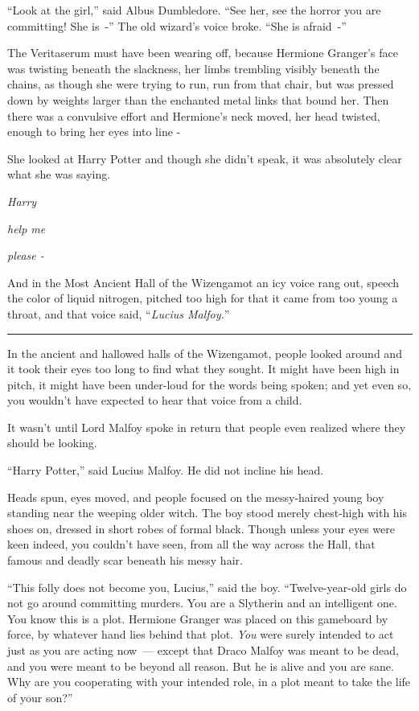 ``Look at the girl,'' said Albus Dumbledore. ``See her, see the horror you are committing! She is~-'' The old wizard's voice broke. ``She is afraid~-''

The Veritaserum must have been wearing off, because Hermione Granger's face was twisting beneath the slackness, her limbs trembling visibly beneath the chains, as though she were trying to run, run from that chair, but was pressed down by weights larger than the enchanted metal links that bound her. Then there was a convulsive effort and Hermione's neck moved, her head twisted, enough to bring her eyes into line -

She looked at Harry Potter and though she didn't speak, it was absolutely clear what she was saying.

\emph{Harry}

\emph{help me}

\emph{please -}

And in the Most Ancient Hall of the Wizengamot an icy voice rang out, speech the color of liquid nitrogen, pitched too high for that it came from too young a throat, and that voice said, ``\emph{Lucius Malfoy.}''

\begin{center}\rule{3in}{0.4pt}\end{center}

In the ancient and hallowed halls of the Wizengamot, people looked around and it took their eyes too long to find what they sought. It might have been high in pitch, it might have been under-loud for the words being spoken; and yet even so, you wouldn't have expected to hear that voice from a child.

It wasn't until Lord Malfoy spoke in return that people even realized where they should be looking.

``Harry Potter,'' said Lucius Malfoy. He did not incline his head.

Heads spun, eyes moved, and people focused on the messy-haired young boy standing near the weeping older witch. The boy stood merely chest-high with his shoes on, dressed in short robes of formal black. Though unless your eyes were keen indeed, you couldn't have seen, from all the way across the Hall, that famous and deadly scar beneath his messy hair.

``This folly does not become you, Lucius,'' said the boy. ``Twelve-year-old girls do not go around committing murders. You are a Slytherin and an intelligent one. You know this is a plot. Hermione Granger was placed on this gameboard by force, by whatever hand lies behind that plot. \emph{You} were surely intended to act just as you are acting now~--- except that Draco Malfoy was meant to be dead, and you were meant to be beyond all reason. But he is alive and you are sane. Why are you cooperating with your intended role, in a plot meant to take the life of your son?''

